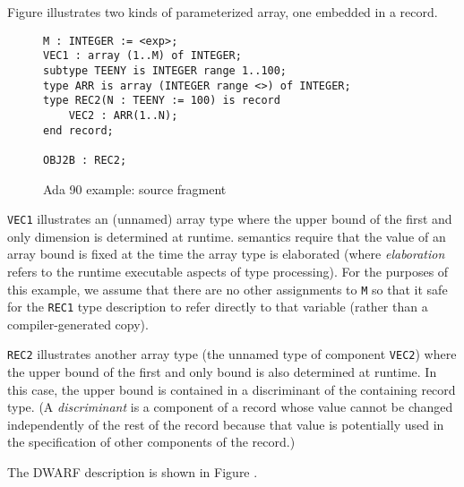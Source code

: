 Figure 
illustrates two kinds of  
parameterized array, one embedded in a record.


\begin{figure}[here]
\begin{lstlisting}
M : INTEGER := <exp>;
VEC1 : array (1..M) of INTEGER;
subtype TEENY is INTEGER range 1..100;
type ARR is array (INTEGER range <>) of INTEGER;
type REC2(N : TEENY := 100) is record
    VEC2 : ARR(1..N);
end record;

OBJ2B : REC2;
\end{lstlisting}
\caption{Ada 90 example: source fragment}
\label{fig:adaexamplesourcefragment}
\end{figure}

\texttt{VEC1} illustrates an (unnamed) array type where the upper bound
of the first and only dimension is determined at runtime. 
semantics require that the value of an array bound is fixed at
the time the array type is elaborated (where \textit{elaboration} refers
to the runtime executable aspects of type processing). For
the purposes of this example, we assume that there are no
other assignments to \texttt{M} so that it safe for the \texttt{REC1} type
description to refer directly to that variable (rather than
a compiler-generated copy).

\texttt{REC2} illustrates another array type (the unnamed type of
component \texttt{VEC2}) where the upper bound of the first and only
bound is also determined at runtime. In this case, the upper
bound is contained in a discriminant of the containing record
type. (A \textit{discriminant} is a component of a record whose value
cannot be changed independently of the rest of the record
because that value is potentially used in the specification
of other components of the record.)

The DWARF description is shown in 
Figure .


